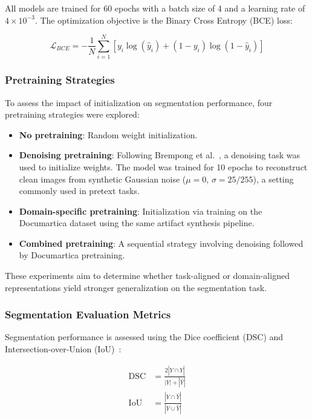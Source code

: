 \documentclass[10pt,a4paper,twocolumn,twoside]{article}
\begin{document}
All models are trained for 60 epochs with a batch size of 4 and a learning rate of $4 \times 10^{-3}$. The optimization objective is the Binary Cross Entropy (BCE) loss:

\begin{equation*}
\mathcal{L}_{BCE} = -\frac{1}{N} \sum_{i=1}^{N} \left[ y_i \log(\hat{y}_i) + (1 - y_i) \log(1 - \hat{y}_i) \right]
\end{equation*}

\subsubsection{Pretraining Strategies}

To assess the impact of initialization on segmentation performance, four pretraining strategies were explored:

\begin{itemize}
    \item \textbf{No pretraining}: Random weight initialization.
    \item \textbf{Denoising pretraining}: Following Brempong et al.~\cite{denoise}, a denoising task was used to initialize weights. The model was trained for 10 epochs to reconstruct clean images from synthetic Gaussian noise ($\mu=0$, $\sigma=25/255$), a setting commonly used in pretext tasks.
    \item \textbf{Domain-specific pretraining}: Initialization via training on the Documartica dataset using the same artifact synthesis pipeline.
    \item \textbf{Combined pretraining}: A sequential strategy involving denoising followed by Documartica pretraining.
\end{itemize}

These experiments aim to determine whether task-aligned or domain-aligned representations yield stronger generalization on the segmentation task.

\subsubsection{Segmentation Evaluation Metrics}

Segmentation performance is assessed using the Dice coefficient (DSC) and Intersection-over-Union (IoU)~\cite{segmetrics}:

\begin{align*}
    \text{DSC} &= \frac{2 |Y \cap \hat{Y}|}{|Y| + |\hat{Y}|} \\
    \text{IoU} &= \frac{|Y \cap \hat{Y}|}{|Y \cup \hat{Y}|}
\end{align*}
\end{document}
